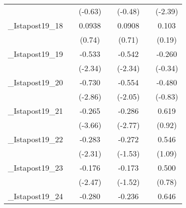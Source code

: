 {\begin{tabular}{l*{6}{c}}
            &                     &     (-0.63)         &                     &     (-0.48)         &                     &     (-2.39)         \\
[1em]
\_Istapost19\_18&                     &      0.0938         &                     &      0.0908         &                     &       0.103         \\
            &                     &      (0.74)         &                     &      (0.71)         &                     &      (0.19)         \\
[1em]
\_Istapost19\_19&                     &      -0.533\sym{*}  &                     &      -0.542\sym{*}  &                     &      -0.260         \\
            &                     &     (-2.34)         &                     &     (-2.34)         &                     &     (-0.34)         \\
[1em]
\_Istapost19\_20&                     &      -0.730\sym{**} &                     &      -0.554\sym{*}  &                     &      -0.480         \\
            &                     &     (-2.86)         &                     &     (-2.05)         &                     &     (-0.83)         \\
[1em]
\_Istapost19\_21&                     &      -0.265\sym{***}&                     &      -0.286\sym{**} &                     &       0.619         \\
            &                     &     (-3.66)         &                     &     (-2.77)         &                     &      (0.92)         \\
[1em]
\_Istapost19\_22&                     &      -0.283\sym{*}  &                     &      -0.272         &                     &       0.546         \\
            &                     &     (-2.31)         &                     &     (-1.53)         &                     &      (1.09)         \\
[1em]
\_Istapost19\_23&                     &      -0.176\sym{*}  &                     &      -0.173         &                     &       0.500         \\
            &                     &     (-2.47)         &                     &     (-1.52)         &                     &      (0.78)         \\
[1em]
\_Istapost19\_24&                     &      -0.280\sym{**} &                     &      -0.236         &                     &       0.646         \\

\end{tabular}}
